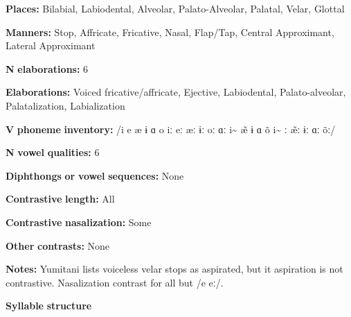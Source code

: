 \begin{styleBody}
\textbf{Places:} Bilabial, Labiodental, Alveolar, Palato-Alveolar, Palatal, Velar, Glottal
\end{styleBody}

\begin{styleBody}
\textbf{Manners:} Stop, Affricate, Fricative, Nasal, Flap/Tap, Central Approximant, Lateral Approximant
\end{styleBody}

\begin{styleBody}
\textbf{N} \textbf{elaborations:} 6
\end{styleBody}

\begin{styleBody}
\textbf{Elaborations:} Voiced fricative/affricate, Ejective, Labiodental, Palato-alveolar, Palatalization, Labialization
\end{styleBody}

\begin{styleBody}
\textbf{V} \textbf{phoneme} \textbf{inventory:} /i e æ ɨ ɑ o iː eː æː ɨː oː ɑː i\~{}  \~{æ} ɨ ɑ õ i\~{} ː \~{æ}ː ɨː ɑː õː/
\end{styleBody}

\begin{styleBody}
\textbf{N} \textbf{vowel} \textbf{qualities:} 6
\end{styleBody}

\begin{styleBody}
\textbf{Diphthongs} \textbf{or} \textbf{vowel} \textbf{sequences:} None
\end{styleBody}

\begin{styleBody}
\textbf{Contrastive} \textbf{length:} All
\end{styleBody}

\begin{styleBody}
\textbf{Contrastive} \textbf{nasalization:} Some
\end{styleBody}

\begin{styleBody}
\textbf{Other} \textbf{contrasts:} None
\end{styleBody}

\begin{styleBody}
\textbf{Notes:} Yumitani lists voiceless velar stops as aspirated, but it aspiration is not contrastive. Nasalization contrast for all but /e eː/.
\end{styleBody}

\begin{styleBody}
\textbf{Syllable} \textbf{structure}
\end{styleBody}

